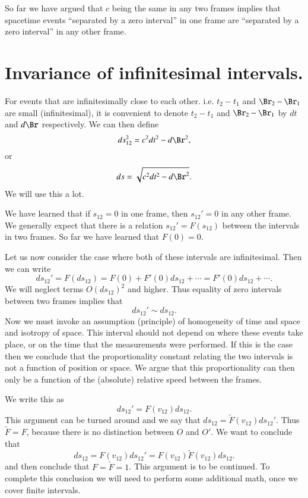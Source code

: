 So far we have argued that \(c\) being the same in any two frames implies that spacetime events ``separated by a zero interval'' in one frame are ``separated by a zero interval'' in any other frame.
%
\section{Invariance of infinitesimal intervals.}
%
For events that are infinitesimally close to each other.  i.e. \(t_2 - t_1\) and \(\Br_2 -\Br_1\) are small (infinitesimal), it is convenient to denote \(t_2 - t_1\) and \(\Br_2 - \Br_1\) by \(dt\) and \(d\Br\) respectively.  We can then define
%
\begin{equation}\label{eqn:relativisticElectrodynamicsL2:60}
ds_{12}^2 = c^2 dt^2 - d\Br^2,
\end{equation}
or
\begin{equation}\label{eqn:relativisticElectrodynamicsL2:60b}
ds= \sqrt{c^2 dt^2 - d\Br^2}.
\end{equation}
We will use this a lot.

We have learned that if \(s_{12} = 0\) in one frame, then \(s_{12}' = 0\) in any other frame.  We generally expect that there is a relation \(s_{12}' = F(s_12)\) between the intervals in two frames.  So far we have learned that \(F(0) = 0\).

Let us now consider the case where both of these intervals are infinitesimal.  Then we can write
%
\begin{equation}\label{eqn:relativisticElectrodynamicsL2:70}
ds_{12}' = F(ds_{12}) = F(0) + F'(0) ds_{12} + \cdots = F'(0) ds_{12} + \cdots.
\end{equation}
%
We will neglect terms \(O(ds_{12})^2\) and higher.  Thus equality of zero intervals between two frames implies that
%
\begin{equation}\label{eqn:relativisticElectrodynamicsL2:80}
ds_{12}' \sim ds_{12}.
\end{equation}
%
Now we must invoke an assumption (principle) of homogeneity of time and space and isotropy of space.  This interval should not depend on where these events take place, or on the time that the measurements were performed.  If this is the case then we conclude that the proportionality constant relating the two intervals is not a function of position or space.  We argue that this proportionality can then only be a function of the (absolute) relative speed between the frames.

We write this as
\begin{equation}\label{eqn:relativisticElectrodynamicsL2:90}
ds_{12}' = F(v_{12}) ds_{12}.
\end{equation}
%
This argument can be turned around and we say that \(ds_{12} = \tilde{F}(v_{12}) ds_{12}'\).  Thus \(\tilde{F} = F\), because there is no distinction between \(O\) and \(O'\).  We want to conclude that
%
\begin{equation}\label{eqn:relativisticElectrodynamicsL2:100}
ds_{12} = F(v_{12}) ds_{12}' = F(v_{12}) \tilde{F}(v_{12}) ds_{12}.
\end{equation}
%
and then conclude that \(F = \tilde{F} = 1\).  This argument is to be continued.  To complete this conclusion we will need to perform some additional math, once we cover finite intervals.

